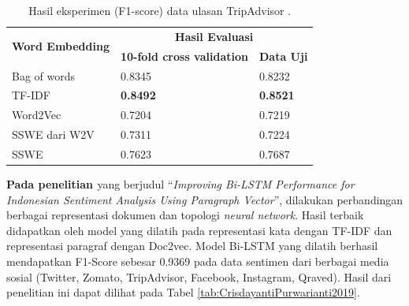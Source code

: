 \begin{table}[]
    \centering
    \caption{Hasil eksperimen (F1-score) data ulasan TripAdvisor \parencite{FarhanKhodra2017}.}
    \begin{tabular}{|l|l|l|}
    \hline
    \multicolumn{1}{|c|}{\multirow{2}{*}{\textbf{Word Embedding}}} & \multicolumn{2}{c|}{\textbf{Hasil Evaluasi}}                                                    \\ \cline{2-3} 
    \multicolumn{1}{|c|}{}                                         & \multicolumn{1}{c|}{\textbf{10-fold cross validation}} & \multicolumn{1}{c|}{\textbf{Data Uji}} \\ \hline
    Bag of words                                                   & 0.8345                                                 & 0.8232                                 \\ \hline
    TF-IDF                                                         & \textbf{0.8492}                                        & \textbf{0.8521}                        \\ \hline
    Word2Vec                                                       & 0.7204                                                 & 0.7219                                 \\ \hline
    SSWE dari W2V                                                  & 0.7311                                                 & 0.7224                                 \\ \hline
    SSWE                                                           & 0.7623                                                 & 0.7687                                 \\ \hline
    \end{tabular}
    \label{tab:FarhanKhodra2017}
\end{table} 

\textbf{Pada penelitian \parencite{CrisdayantiPurwarianti2019}} yang berjudul “\textit{Improving Bi-LSTM Performance for Indonesian Sentiment Analysis Using Paragraph Vector}”, dilakukan perbandingan berbagai representasi dokumen dan topologi \textit{neural network}. Hasil terbaik didapatkan oleh model yang dilatih pada representasi kata dengan TF-IDF dan representasi paragraf dengan Doc2vec. Model Bi-LSTM yang dilatih berhasil mendapatkan F1-Score sebesar 0.9369 pada data sentimen dari berbagai media sosial (Twitter, Zomato, TripAdvisor, Facebook, Instagram, Qraved). Hasil dari penelitian ini dapat dilihat pada Tabel \ref{tab:CrisdayantiPurwarianti2019}.


